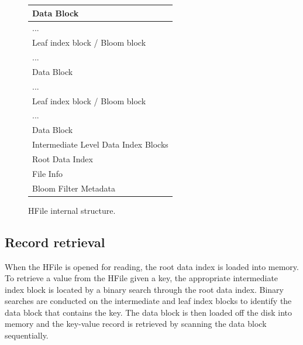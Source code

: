 \begin{figure}
  \begin{center}
    \begin{tabular}{|l|}
      \hline
      \rowcolor[gray]{0.85}
      Data Block \\
      \hline
      \rowcolor[gray]{0.86}
      ... \\
      \hline
      \rowcolor[gray]{0.95}
      Leaf index block / Bloom block \\
      \hline
      \rowcolor[gray]{0.86}
      ... \\
      \hline
      \rowcolor[gray]{0.85}
      Data Block \\
      \hline
      \rowcolor[gray]{0.86}
      ... \\
      \hline
      \rowcolor[gray]{0.95}
      Leaf index block / Bloom block \\
      \hline
      \rowcolor[gray]{0.86}
      ... \\
      \hline
      \rowcolor[gray]{0.85}
      Data Block \\
      \hline
      \rowcolor[gray]{0.7}
      Intermediate Level Data Index Blocks \\
      \hline
      \rowcolor[gray]{0.6}
      Root Data Index \\
      \hline
      \rowcolor[gray]{0.6}
      File Info \\
      \hline
      \rowcolor[gray]{0.6}
      Bloom Filter Metadata \\
      \hline
    \end{tabular}
    \caption[Caption for LOF]{HFile internal structure.\footnotemark}
    \label{fig:hfile}
  \end{center}
\end{figure}


\subsection{Record retrieval}

When the HFile is opened for reading, the root data index is loaded into memory.
To retrieve a value from the HFile given a key, the appropriate intermediate
index block is located by a binary search through the root data index. Binary
searches are conducted on the intermediate and leaf index blocks to identify the
data block that contains the key. The data block is then loaded off the disk
into memory and the key-value record is retrieved by scanning the data block
sequentially.

